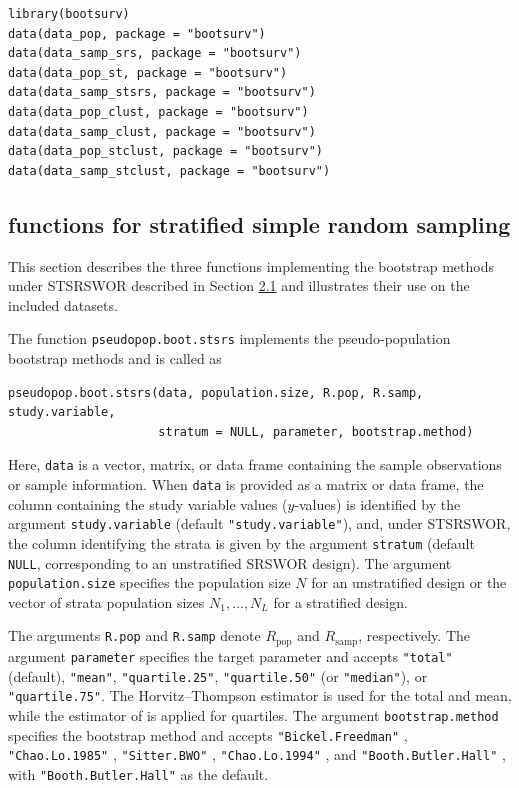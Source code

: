 \begin{verbatim}
library(bootsurv)
data(data_pop, package = "bootsurv")
data(data_samp_srs, package = "bootsurv")
data(data_pop_st, package = "bootsurv")
data(data_samp_stsrs, package = "bootsurv")
data(data_pop_clust, package = "bootsurv")
data(data_samp_clust, package = "bootsurv")
data(data_pop_stclust, package = "bootsurv")
data(data_samp_stclust, package = "bootsurv")
\end{verbatim}

\subsection{\texorpdfstring{ functions for stratified simple random sampling}{ functions for stratified simple random sampling}}\label{sec:pkgbootsurvsrs}

This section describes the three  functions implementing the bootstrap methods under STSRSWOR described in Section \hyperref[Boot_STSRSWOR]{2.1} and illustrates their use on the included datasets.

The function \texttt{pseudopop.boot.stsrs} implements the pseudo-population bootstrap methods and is called as

\begin{verbatim}
pseudopop.boot.stsrs(data, population.size, R.pop, R.samp, study.variable,
                     stratum = NULL, parameter, bootstrap.method)
\end{verbatim}

Here, \texttt{data} is a vector, matrix, or data frame containing the sample observations or sample information. When \texttt{data} is provided as a matrix or data frame, the column containing the study variable values (\(y\)-values) is identified by the argument \texttt{study.variable} (default \texttt{"study.variable"}), and, under STSRSWOR, the column identifying the strata is given by the argument \texttt{stratum} (default \texttt{NULL}, corresponding to an unstratified SRSWOR design). The argument \texttt{population.size} specifies the population size \(N\) for an unstratified design or the vector of strata population sizes \(N_1, \ldots, N_L\) for a stratified design.

The arguments \texttt{R.pop} and \texttt{R.samp} denote \(R_{\text{pop}}\) and \(R_{\text{samp}}\), respectively.
The argument \texttt{parameter} specifies the target parameter and accepts \texttt{"total"} (default), \texttt{"mean"}, \texttt{"quartile.25"}, \texttt{"quartile.50"} (or \texttt{"median"}), or \texttt{"quartile.75"}. The Horvitz--Thompson estimator is used for the total and mean, while the estimator of \citet[Chapter 5]{Sarndal:Swensson:Wretman:1992} is applied for quartiles. The argument \texttt{bootstrap.method} specifies the bootstrap method and accepts \texttt{"Bickel.Freedman"} \citep{Bickel:Freedman:1984}, \texttt{"Chao.Lo.1985"} \citep{Chao:Lo:1985}, \texttt{"Sitter.BWO"} \citep{Sitter:1992a}, \texttt{"Chao.Lo.1994"} \citep{Chao:Lo:1994}, and \texttt{"Booth.Butler.Hall"} \citep{Booth:Butler:Hall:1994}, with \texttt{"Booth.Butler.Hall"} as the default.

